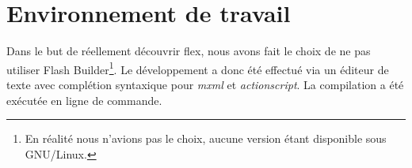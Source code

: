 \section{Environnement de travail}

Dans le but de réellement découvrir flex, nous avons fait le choix de ne pas utiliser Flash Builder\footnote{En réalité nous n'avions pas le choix, aucune version étant disponible sous GNU/Linux.}. Le développement a donc été effectué via un éditeur de texte avec complétion syntaxique pour \emph{mxml} et \emph{actionscript}. La compilation a été exécutée en ligne de commande.